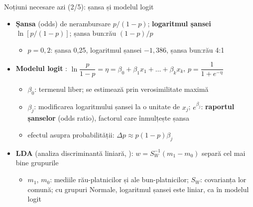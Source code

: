 \begin{frame}{Noțiuni necesare azi (2/5): șansa și modelul logit}
\itemsize{\footnotesize}
\begin{itemize}
    \item \textbf{Șansa} (odds) de nerambursare $p/(1 - p)$; \textbf{logaritmul șansei} $\ln[p/(1 - p)]$; șansa bun:rău $(1 - p)/p$
    \begin{itemize}
        \item $p = 0{,}2$: șansa 0,25, logaritmul șansei $-1{,}386$, șansa bun:rău 4:1
    \end{itemize}
    \item \textbf{Modelul logit} : $\ln\dfrac{p}{1 - p} = \eta = \beta_0 + \beta_1x_1 + \dots + \beta_kx_k$, \quad $p = \dfrac{1}{1 + e^{-\eta}}$
    \begin{itemize}
        \item $\beta_0$: termenul liber; se estimează prin verosimilitate maximă
        \item $\beta_j$: modificarea logaritmului șansei la o unitate de $x_j$; $e^{\beta_j}$: \textbf{raportul șanselor} (odds ratio), factorul care înmulțește șansa
        \item efectul asupra probabilității: $\Delta p \approx p(1 - p)\beta_j$
    \end{itemize}
    \item \textbf{LDA} (analiza discriminantă liniară, ): $w = S_W^{-1}(m_1 - m_0)$ separă cel mai bine grupurile
    \begin{itemize}
        \item $m_1$, $m_0$: mediile rău-platnicilor și ale bun-platnicilor; $S_W$: covarianța lor comună; cu grupuri Normale, logaritmul șansei este liniar, ca în modelul logit
    \end{itemize}
\end{itemize}
\end{frame}

